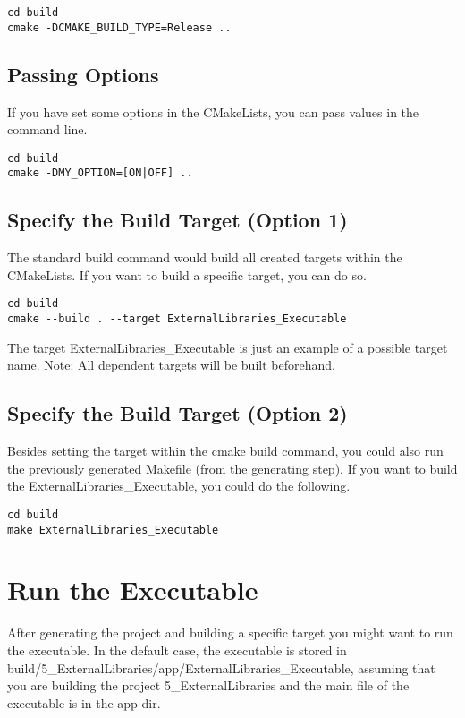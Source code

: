 \documentclass[openany]{report}
\begin{document}
\begin{verbatim}
cd build
cmake -DCMAKE_BUILD_TYPE=Release ..
\end{verbatim}

\subsection{Passing Options}

If you have set some options in the CMakeLists, you can pass values in the command line.

\begin{verbatim}
cd build
cmake -DMY_OPTION=[ON|OFF] ..
\end{verbatim}

\subsection{Specify the Build Target (Option 1)}

The standard build command would build all created targets within the CMakeLists.
If you want to build a specific target, you can do so.

\begin{verbatim}
cd build
cmake --build . --target ExternalLibraries_Executable
\end{verbatim}

The target ExternalLibraries\_Executable is just an example of a possible target name.
Note: All dependent targets will be built beforehand.

\subsection{Specify the Build Target (Option 2)}


Besides setting the target within the cmake build command, you could also run the previously generated Makefile (from the generating step).
If you want to build the ExternalLibraries\_Executable, you could do the following.

\begin{verbatim}
cd build
make ExternalLibraries_Executable
\end{verbatim}


\section{Run the Executable}

After generating the project and building a specific target you might want to run the executable.
In the default case, the executable is stored in build/5\_ExternalLibraries/app/ExternalLibraries\_Executable, assuming that you are building the project 5\_ExternalLibraries and the main file of the executable is in the app dir.
\end{document}
